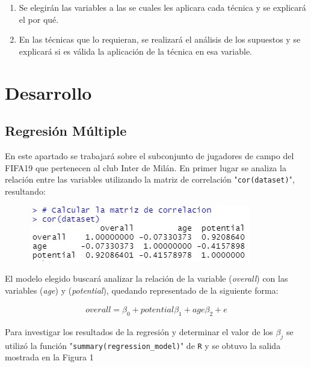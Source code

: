 \documentclass[a4paper,10pt,twocolumn]{article}
\begin{document}
\begin{enumerate}
	\item Se elegirán las variables a las se cuales les aplicara cada técnica y se explicará el por qué.
	\item En las técnicas que lo requieran,  se realizará el análisis de los supuestos y se explicará si es válida la aplicación de la técnica en esa variable.
\end{enumerate}


\section*{Desarrollo}\label{sec:dev}
  
\subsection*{Regresión Múltiple}

En este apartado se trabajará sobre el subconjunto de jugadores de campo del FIFA19 que pertenecen al club Inter de Milán.
En primer lugar se analiza la relación entre las variables utilizando la matriz de correlación "\verb|cor(dataset)|", resultando:

\begin{figure}[h]
	\includegraphics[scale=0.86]{./imgs/reg_correlation.jpg}
\end{figure}

El modelo elegido buscará analizar la relación de la variable (\textit{overall}) con las variables (\textit{age}) y (\textit{potential}), quedando representado de la siguiente forma:

\begin{align*}
overall = \beta_0 + potential \beta_1 + age \beta_2 + e
\end{align*}

Para investigar los resultados de la regresión y determinar el valor de los $\beta_j$ se utilizó la función "\verb|summary(regression_model)|" de \verb|R| y se obtuvo la salida mostrada en la Figura 1\\\\\\
\end{document}

